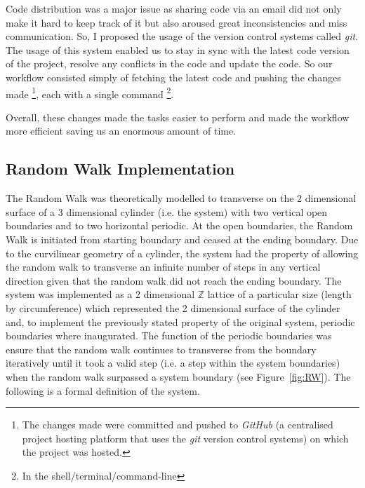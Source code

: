 \documentclass{article}
\begin{document}
Code distribution was a major issue as sharing code via an email did not only make it hard to keep track of it but also aroused great inconsistencies and miss communication. So, I proposed the usage of the version control systems called \emph{git}. The usage of this system enabled us to stay in sync with the latest code version of the project, resolve any conflicts in the code and update the code. So our workflow consisted simply of fetching the latest code and pushing the changes made \footnote{The changes made were committed and pushed to \emph{GitHub} (a centralised project hosting platform that uses the \emph{git} version control systems) on which the project was hosted.}, each with a single command  \footnote{In the shell/terminal/command-line}.

Overall, these changes made the tasks easier to perform and made the workflow more efficient saving us an enormous amount of time.


\subsection{Random Walk Implementation}
	The Random Walk was theoretically modelled to transverse on the 2 dimensional surface of a 3 dimensional cylinder (i.e. the system) with two vertical open boundaries and to two horizontal periodic. At the open boundaries, the Random Walk is initiated from starting boundary and ceased at the ending boundary. Due to the curvilinear geometry of a cylinder, the system had the property of allowing the random walk to transverse an infinite number of steps in any vertical direction given that the random walk did not reach the ending boundary.
The system was implemented as a 2 dimensional $\mathbb{Z}$ lattice of a particular size (length by circumference) which represented the 2 dimensional surface of the cylinder and, to implement the previously stated property of the original system, periodic boundaries where inaugurated. The function of the periodic boundaries was ensure that the random walk continues to transverse from the boundary iteratively until it took a valid step (i.e. a step within the system boundaries) when the random walk surpassed a system boundary (see Figure~\ref{fig:RW}). The following is a formal definition of the system.
\end{document}
